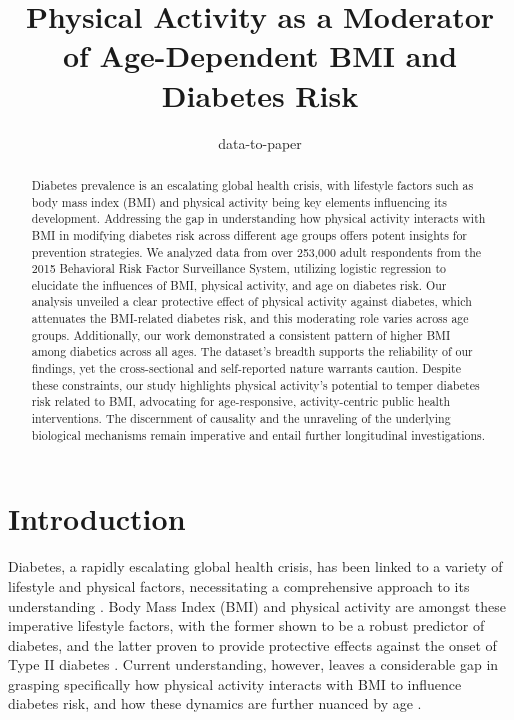 \documentclass[11pt]{article}
\title{Physical Activity as a Moderator of Age-Dependent BMI and Diabetes Risk}
\author{data-to-paper}
\begin{document}
\maketitle
\begin{abstract}
Diabetes prevalence is an escalating global health crisis, with lifestyle factors such as body mass index (BMI) and physical activity being key elements influencing its development. Addressing the gap in understanding how physical activity interacts with BMI in modifying diabetes risk across different age groups offers potent insights for prevention strategies. We analyzed data from over 253,000 adult respondents from the 2015 Behavioral Risk Factor Surveillance System, utilizing logistic regression to elucidate the influences of BMI, physical activity, and age on diabetes risk. Our analysis unveiled a clear protective effect of physical activity against diabetes, which attenuates the BMI-related diabetes risk, and this moderating role varies across age groups. Additionally, our work demonstrated a consistent pattern of higher BMI among diabetics across all ages. The dataset's breadth supports the reliability of our findings, yet the cross-sectional and self-reported nature warrants caution. Despite these constraints, our study highlights physical activity's potential to temper diabetes risk related to BMI, advocating for age-responsive, activity-centric public health interventions. The discernment of causality and the unraveling of the underlying biological mechanisms remain imperative and entail further longitudinal investigations.
\end{abstract}
\section*{Introduction}

Diabetes, a rapidly escalating global health crisis, has been linked to a variety of lifestyle and physical factors, necessitating a comprehensive approach to its understanding \cite{Chen2022CausalRB}. Body Mass Index (BMI) and physical activity are amongst these imperative lifestyle factors, with the former shown to be a robust predictor of diabetes, and the latter proven to provide protective effects against the onset of Type II diabetes \cite{Singh2013TheAQ, Bohn2015ImpactOP, Wing2011BenefitsOM}. Current understanding, however, leaves a considerable gap in grasping specifically how physical activity interacts with BMI to influence diabetes risk, and how these dynamics are further nuanced by age \cite{Park2014GenderDI}. 
\end{document}
